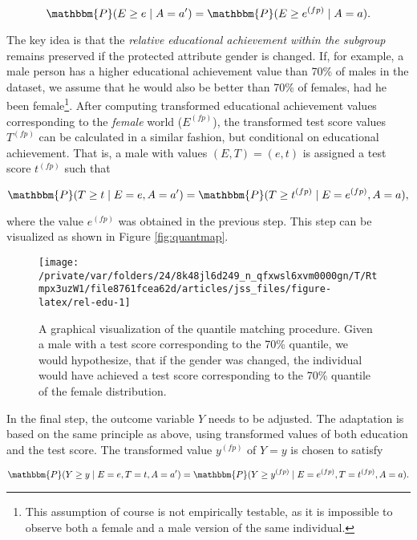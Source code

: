 \documentclass[
  nojss]{jss}
\begin{document}
\[\mathbbm{P}(E \geq e \mid A = a') = \mathbbm{P}(E \geq  {e}^{(fp)} \mid A = a).\]

The key idea is that the \emph{relative educational achievement within
the subgroup} remains preserved if the protected attribute gender is
changed. If, for example, a male person has a higher educational
achievement value than 70\% of males in the dataset, we assume that he
would also be better than 70\% of females, had he been female\footnote{This
  assumption of course is not empirically testable, as it is impossible
  to observe both a female and a male version of the same individual.}.
After computing transformed educational achievement values corresponding
to the \emph{female} world (\( {E}^{(fp)}\)), the transformed test score
values \( {T}^{(fp)}\) can be calculated in a similar fashion, but
conditional on educational achievement. That is, a male with values
\((E, T) = (e, t)\) is assigned a test score \( {t}^{(fp)}\) such that

\[\mathbbm{P}(T \geq t \mid E = e, A = a') = \mathbbm{P}(T \geq  {t}^{(fp)} \mid E =  {e}^{(fp)}, A = a),\]

where the value \( {e}^{(fp)}\) was obtained in the previous step. This
step can be visualized as shown in Figure \ref{fig:quantmap}.

\begin{CodeChunk}
\begin{figure}

{\centering \texttt{[image: /private/var/folders/24/8k48jl6d249\_n\_qfxwsl6xvm0000gn/T/Rtmpx3uzW1/file8761fcea62d/articles/jss\_files/figure-latex/rel-edu-1]} 

}

\caption{\label{fig:quantmap}A graphical visualization of the quantile matching procedure. Given a male with a test score corresponding to the 70\% quantile, we would hypothesize, that if the gender was changed, the individual would have achieved a test score corresponding to the 70\% quantile of the female distribution.}\label{fig:rel-edu}
\end{figure}
\end{CodeChunk}

In the final step, the outcome variable \(Y\) needs to be adjusted. The
adaptation is based on the same principle as above, using transformed
values of both education and the test score. The transformed value
\( {y}^{(fp)}\) of \(Y = y\) is chosen to satisfy

\[\mathbbm{P}(Y \geq y \mid E = e, T = t, A = a') = \mathbbm{P}(Y \geq  {y}^{(fp)} \mid E =  {e}^{(fp)}, T =  {t}^{(fp)}, A = a).\]
\end{document}
